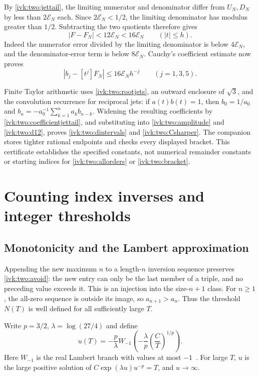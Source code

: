 \documentclass[11pt,letterpaper]{article}
\theoremstyle{remark}\newtheorem{remark}[theorem]{Remark}
\begin{document}
By \eqref{ivk:two:jettail}, the limiting numerator and denominator differ
from $U_N,D_N$ by less than $2\mathcal E_N$ each.
Since $2\mathcal E_N<1/2$, the limiting denominator has modulus
greater than $1/2$. Subtracting the two quotients therefore gives
\begin{equation}\label{ivk:two:quotientjettail}
 |F-F_N|<12\mathcal E_N<16\mathcal E_N\qquad(|t|\le h).
\end{equation}
Indeed the numerator error divided by the limiting denominator is
below $4\mathcal E_N$, and the denominator-error term is below
$8\mathcal E_N$. Cauchy's coefficient estimate now proves
\begin{equation}\label{ivk:two:coefficientjettail}
 |b_j-[t^j]F_N|\le16\mathcal E_Nh^{-j}
 \qquad(j=1,3,5).
\end{equation}

Finite Taylor arithmetic uses \eqref{ivk:two:rootjets}, an outward enclosure
of $\sqrt3$, and the convolution recurrence for reciprocal jets:
if $a(t)b(t)=1$, then
$b_0=1/a_0$ and $b_n=-a_0^{-1}\sum_{k=1}^na_kb_{n-k}$.
Widening the resulting coefficients by \eqref{ivk:two:coefficientjettail},
and substituting into \eqref{ivk:two:amplitude} and \eqref{ivk:two:d12}, proves
\eqref{ivk:two:dintervals} and \eqref{ivk:two:Csharper}. The companion stores tighter
rational endpoints and checks every displayed bracket. This certificate
establishes the specified constants, not numerical remainder constants
or starting indices for \eqref{ivk:two:allorders} or \eqref{ivk:two:bracket}.

\section{Counting index inverses and integer thresholds}\label{ivk:two:sec:inverses}
\subsection{Monotonicity and the Lambert approximation}
Appending the new maximum $n$ to a length-$n$ inversion sequence
preserves \eqref{ivk:two:avoid}: the new entry can only be the last member of
a triple, and no preceding value exceeds it. This is an injection
into the size-$n+1$ class. For $n\ge1$, the all-zero sequence is
outside its image, so $a_{n+1}>a_n$. Thus the threshold $N(T)$ is
well defined for all sufficiently large $T$.

Write $p=3/2$, $\lambda=\log(27/4)$ and define
\begin{equation}\label{ivk:two:udef}
 u(T)=-\frac p\lambda
 W_{-1}\!\left(-\frac\lambda p\left(\frac CT\right)^{1/p}\right).
\end{equation}
Here $W_{-1}$ is the real Lambert branch with values at most $-1$~\cite{lambert}.
For large $T$, $u$ is the large positive solution of
$C\exp(\lambda u)u^{-p}=T$, and $u\to\infty$.
\end{document}
